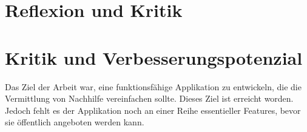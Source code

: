 \documentclass[a4paper,11pt]{report}
\begin{document}
		
		\chapter{Reflexion und Kritik}
		
		\chapter{Kritik und Verbesserungspotenzial}
		Das Ziel der Arbeit war, eine funktionsfähige Applikation zu entwickeln, die die Vermittlung von Nachhilfe vereinfachen sollte. Dieses Ziel ist erreicht worden. Jedoch fehlt es der Applikation noch an einer Reihe  essentieller Features, bevor sie öffentlich angeboten werden kann.
		
\end{document}
